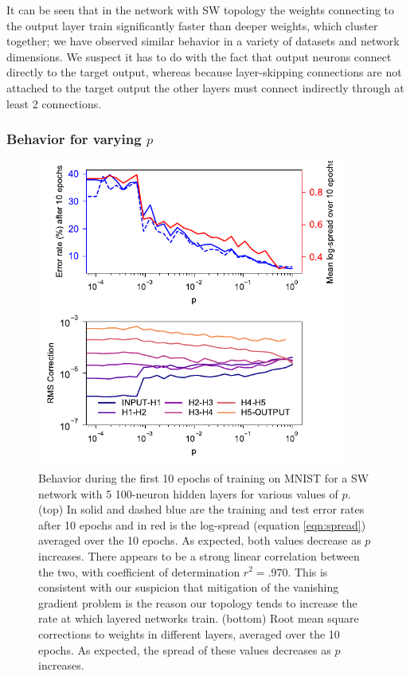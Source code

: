 \documentclass[utf8]{frontiersSCNS}
\begin{document}
It can be seen that in the network with SW topology the weights connecting to the output layer train significantly faster than deeper weights, which cluster together; we have observed similar behavior in a variety of datasets and network dimensions. We suspect it has to do with the fact that output neurons connect directly to the target output, whereas because layer-skipping connections are not attached to the target output the other layers must connect indirectly through at least 2 connections.

\subsubsection{Behavior for varying $p$}\label{sec:sweep}

\begin{figure}
	\centering
	\includegraphics[width=4in]{figures/mnist_5layer_sweep.pdf}
	\caption{Behavior during the first 10 epochs of training on MNIST for a SW network with 5 100-neuron hidden layers for various values of $p$. (top) In solid and dashed blue are the training and test error rates after 10 epochs and in red is the log-spread (equation \ref{eqn:spread}) averaged over the 10 epochs. As expected, both values decrease as $p$ increases. There appears to be a strong linear correlation between the two, with coefficient of determination $r^2=.970$. This is consistent with our suspicion that mitigation of the vanishing gradient problem is the reason our topology tends to increase the rate at which layered networks train. (bottom) Root mean square corrections to weights in different layers, averaged over the 10 epochs. As expected, the spread of these values decreases as $p$ increases.}
	\label{fig:sweep}
\end{figure}
\end{document}
